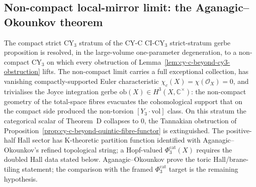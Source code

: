 \subsection{Non-compact local-mirror limit: the Aganagic--Okounkov theorem}
\label{subsec:cy-c-beyond-noncompact-aganagic-okounkov}

The compact strict CY$_3$ stratum of
the CY-C CI-CY$_3$ strict-stratum gerbe proposition is resolved,
in the large-volume one-parameter degeneration, to a non-compact
CY$_3$ on which every obstruction of
Lemma~\ref{lem:cy-c-beyond-cy3-obstruction} lifts. The non-compact
limit carries a full exceptional collection, has vanishing
compactly-supported Euler characteristic
$\chi_c(X) = \chi(\mathcal O_X) = 0$, and trivialises the Joyce
integration gerbe $\mathrm{ob}(X) \in H^3(X, \mathbb C^\times)$: the
non-compact geometry of the total-space fibres evacuates the
cohomological support that on the compact side produced the
non-torsion $[Y_3 \cdot \mathrm{vol}]$ class. On this stratum the
categorical scalar of Theorem~D collapses to $0$, the
Tannakian obstruction of
Proposition~\ref{prop:cy-c-beyond-quintic-fibre-functor} is
extinguished. The positive-half Hall sector has K-theoretic partition
function identified with Aganagic--Okounkov's refined topological string;
a Hopf-valued \(\Phi_3^{\mathrm{cat}}(X)\) requires the doubled Hall data
stated below. Aganagic--Okounkov
prove the toric Hall/brane-tiling statement; the comparison with the
framed $\Phi_3^{\mathrm{cat}}$ target is the remaining hypothesis.

